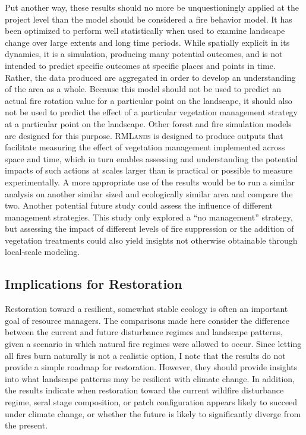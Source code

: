 Put another way, these results should no more be unquestioningly applied at the project level than the model should be considered a fire behavior model. It has been optimized to perform well statistically when used to examine landscape change over large extents and long time periods. While spatially explicit in its dynamics, it is a simulation, producing many potential outcomes, and is not intended to predict specific outcomes at specific places and points in time. Rather, the data produced are aggregated in order to develop an understanding of the area as a whole. Because this model should not be used to predict an actual fire rotation value for a particular point on the landscape, it should also not be used to predict the effect of a particular vegetation management strategy at a particular point on the landscape. Other forest and fire simulation models are designed for this purpose. \textsc{RMLands} is designed to produce outputs that facilitate measuring the effect of vegetation management implemented across space and time, which in turn enables assessing and understanding the potential impacts of such actions at scales larger than is practical or possible to measure experimentally.  A more appropriate use of the results would be to run a similar analysis on another similar sized and ecologically similar area and compare the two. Another potential future study could assess the influence of different management strategies. This study only explored a ``no management'' strategy, but assessing the impact of different levels of fire suppression or the addition of vegetation treatments could also yield insights not otherwise obtainable through local-scale modeling.


\subsection*{Implications for Restoration}

Restoration toward a resilient, somewhat stable ecology is often an important goal of resource managers. The comparisons made here consider the difference between the current and future disturbance regimes and landscape patterns, given a scenario in which natural fire regimes were allowed to occur. Since letting all fires burn naturally is not a realistic option, I note that the results do not provide a simple roadmap for restoration. However, they should provide insights into what landscape patterns may be resilient with climate change. In addition, the results indicate when restoration toward the current wildfire disturbance regime, seral stage composition, or patch configuration appears likely to succeed under climate change, or whether the future is likely to significantly diverge from the present. 

